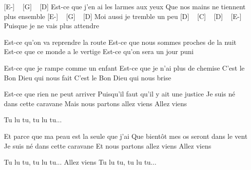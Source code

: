 [E-] ~ [G] ~ [D]
Est-ce que j'en ai les larmes aux yeux
Que nos mains ne tiennent plus ensemble
[E-] ~ [G] ~ [D]
Moi aussi je tremble un peu
[D] ~ [C] ~ [D] ~ [E-]
Puisque je ne vais plus attendre

Est-ce qu'on va reprendre la route
Est-ce que nous sommes proches de la nuit
Est-ce que ce monde a le vertige
Est-ce qu'on sera un jour puni

Est-ce que je rampe comme un enfant
Est-ce que je n'ai plus de chemise
C'est le Bon Dieu qui nous fait
C'est le Bon Dieu qui nous brise

Est-ce que rien ne peut arriver
Puisqu'il faut qu'il y ait une justice
Je suis né dans cette caravane
Mais nous partons allez viens
Allez viens

Tu lu tu, tu lu tu...


Et parce que ma peau est la seule que j'ai
Que bientôt mes os seront dans le vent
Je suis né dans cette caravane
Et nous partons allez viens
Allez viens

Tu lu tu, tu lu tu...
Allez viens
Tu lu tu, tu lu tu... 